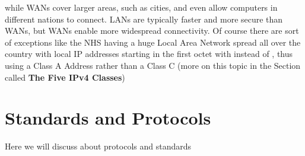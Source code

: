 \documentclass[a4paper,12pt]{book}
\begin{document}
\noindent while WANs cover larger areas, such as cities, and even allow computers in different nations to connect.
LANs are typically faster and more secure than WANs, but WANs enable more widespread connectivity. Of course there are sort of exceptions like the NHS having a huge Local Area Network spread all over the country with local IP addresses starting in the first octet with  instead of , thus using a Class A Address rather than a Class C (more on this topic in the Section called \textbf{The Five IPv4 Classes}) 


\chapter{Standards and Protocols}
Here we will discuss about protocols and standards
\clearpage
\end{document}
